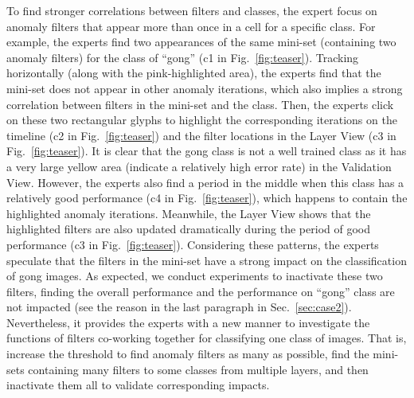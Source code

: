 \documentclass[format=acmsmall, review=false, screen=true]{acmart}
\begin{document}
To find stronger correlations between filters and classes, the expert focus on anomaly filters that appear more than once in a cell for a specific class.
For example, the experts find two appearances of the same mini-set (containing two anomaly filters) for the class of ``gong'' (c1 in Fig.~\ref{fig:teaser}).
Tracking horizontally (along with the pink-highlighted area), the experts find that the mini-set does not appear in other anomaly iterations, which also implies a strong correlation between filters in the mini-set and the class.
Then, the experts click on these two rectangular glyphs to highlight the corresponding iterations on the timeline (c2 in Fig.~\ref{fig:teaser}) and the filter locations in the Layer View (c3 in Fig.~\ref{fig:teaser}).
It is clear that the gong class is not a well trained class as it has a very large yellow area (indicate a relatively high error rate) in the Validation View.
However, the experts also find a period in the middle when this class has a relatively good performance (c4 in Fig.~\ref{fig:teaser}), which happens to contain the highlighted anomaly iterations.
Meanwhile, the Layer View shows that the highlighted filters are also updated dramatically during the period of good performance (c3 in Fig.~\ref{fig:teaser}).
Considering these patterns, the experts speculate that the filters in the mini-set have a strong impact on the classification of gong images. 
As expected, we conduct experiments to inactivate these two filters, finding the overall performance and the performance on ``gong'' class are not impacted (see the reason in the last paragraph in Sec.~\ref{sec:case2}). Nevertheless, it provides the experts with a new manner to investigate the functions of filters co-working together for classifying one class of images. That is, increase the threshold to find anomaly filters as many as possible, find the mini-sets containing many filters to some classes from multiple layers, and then inactivate them all to validate corresponding impacts.
\end{document}
